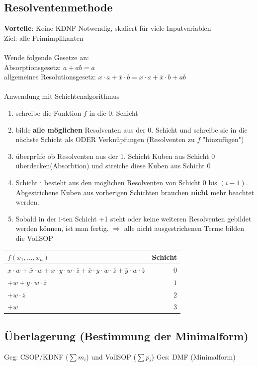 \documentclass[6pt,a4paper]{scrartcl}
\newcommand{\Ra}[0]{\ensuremath{\Rightarrow}}									%
\begin{document}
\begin{multicols*}{3}
	\subsection{Resolventenmethode} %
	\label{sec:Resolventenmethode}
		\textbf{Vorteile}: Keine KDNF Notwendig, skaliert für viele Inputvariablen\\
		Ziel: alle Primimplikanten \\ \\
		Wende folgende Gesetze an: \\
		Absorptionsgesetz: $a + ab = a$ \\
		allgemeines Resolutionsgesetz: $x \cdot a + \overline x \cdot b = x \cdot a + \overline x \cdot b + ab$ \\
		\\
		Anwendung mit Schichtenalgorithmus
		\begin{enumerate}
			\item schreibe die Funktion $f$ in die 0. Schicht
			\item bilde \textbf{alle möglichen} Resolventen aus der 0. Schicht und schreibe sie in die nächste Schicht als ODER Verknüpfungen (Resolventen zu $f$ "hinzufügen")
			\item überprüfe ob Resolventen aus der 1. Schicht Kuben aus Schicht 0 überdecken(Absorbtion) und streiche diese Kuben aus Schicht 0
			\item Schicht i besteht aus den möglichen Resolventen von Schicht 0 bis $(i-1)$. Abgestrichene Kuben aus vorherigen Schichten brauchen \textbf{nicht} mehr beachtet werden.
			\item Sobald in der i-ten Schicht +1 steht oder keine weiteren Resolventen gebildet werden können, ist man fertig. 
			$\Ra $ alle nicht ausgestrichenen Terme bilden die VollSOP
		\end{enumerate}
		
		\begin{tabular}{l | r}
		$f(x_1, \ldots, x_n)$ & Schicht \\ \midrule
		$x \cdot w + \overline x \cdot w + x \cdot y \cdot w \cdot \overline z + \overline x \cdot y \cdot w \cdot \overline z + \overline y \cdot w \cdot \overline z $& $0$ \\
		$+ w + y \cdot w \cdot \overline z$ & $1$ \\
		$+ w \cdot \overline z $ & $2$ \\
		$+ w$ &$ 3$
		\end{tabular}

	\subsection{Überlagerung (Bestimmung der Minimalform)}
	Geg: CSOP/KDNF ($\sum m_i$) und VollSOP ($\sum p_i$) \qquad Ges: DMF (Minimalform)\\

\end{multicols*}
\end{document}
